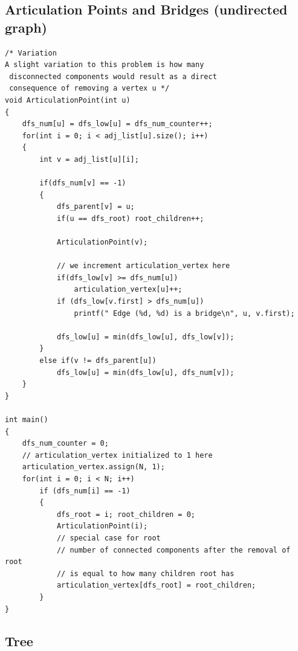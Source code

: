 \documentclass[8pt, a4paper, oneside, twocolumn]{extarticle}
\begin{document}
\subsection{Articulation Points and Bridges (undirected graph)}
\begin{verbatim}
/* Variation
A slight variation to this problem is how many
 disconnected components would result as a direct 
 consequence of removing a vertex u */
void ArticulationPoint(int u)
{
    dfs_num[u] = dfs_low[u] = dfs_num_counter++;
    for(int i = 0; i < adj_list[u].size(); i++)
    {
        int v = adj_list[u][i];
        
        if(dfs_num[v] == -1)
        {
            dfs_parent[v] = u;
            if(u == dfs_root) root_children++;

            ArticulationPoint(v);
            
            // we increment articulation_vertex here
            if(dfs_low[v] >= dfs_num[u])
                articulation_vertex[u]++;
            if (dfs_low[v.first] > dfs_num[u])
                printf(" Edge (%d, %d) is a bridge\n", u, v.first);
                
            dfs_low[u] = min(dfs_low[u], dfs_low[v]);
        }
        else if(v != dfs_parent[u])
            dfs_low[u] = min(dfs_low[u], dfs_num[v]);
    }
}

int main() 
{
    dfs_num_counter = 0;
    // articulation_vertex initialized to 1 here
    articulation_vertex.assign(N, 1);
    for(int i = 0; i < N; i++)
        if (dfs_num[i] == -1)
        {
            dfs_root = i; root_children = 0;
            ArticulationPoint(i);
            // special case for root
            // number of connected components after the removal of root
            // is equal to how many children root has
            articulation_vertex[dfs_root] = root_children;
        }
}
\end{verbatim}
\subsection{Tree}
\end{document}

